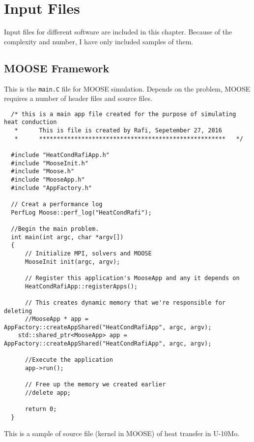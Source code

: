 \chapter{Input Files}\label{appen_inputfiles}
Input files for different software are included in this chapter. Because of the complexity and number, I have only included samples of them.

\section{MOOSE Framework}
This is the \texttt{main.C} file for MOOSE simulation. Depends on the problem, MOOSE requires a number of header files and source files.  

\lstset{style=cpp}
\begin{lstlisting}
  /* this is a main app file created for the purpose of simulating heat conduction
   *      This is file is created by Rafi, Sepetember 27, 2016
   *      *****************************************************   */
  
  #include "HeatCondRafiApp.h"
  #include "MooseInit.h"
  #include "Moose.h"
  #include "MooseApp.h"
  #include "AppFactory.h"
  
  // Creat a performance log
  PerfLog Moose::perf_log("HeatCondRafi");
  
  //Begin the main problem.
  int main(int argc, char *argv[])
  {
      // Initialize MPI, solvers and MOOSE
      MooseInit init(argc, argv);
  
      // Register this application's MooseApp and any it depends on
      HeatCondRafiApp::registerApps();
  
      // This creates dynamic memory that we're responsible for deleting
      //MooseApp * app =  AppFactory::createAppShared("HeatCondRafiApp", argc, argv);
    std::shared_ptr<MooseApp> app = AppFactory::createAppShared("HeatCondRafiApp", argc, argv);
  
      //Execute the application
      app->run();
  
      // Free up the memory we created earlier
      //delete app;
  
      return 0;
  }
\end{lstlisting}
\pagebreak
This is a sample of source file (kernel in MOOSE) of heat transfer in U-10Mo.
\lstset{style=cpp}
